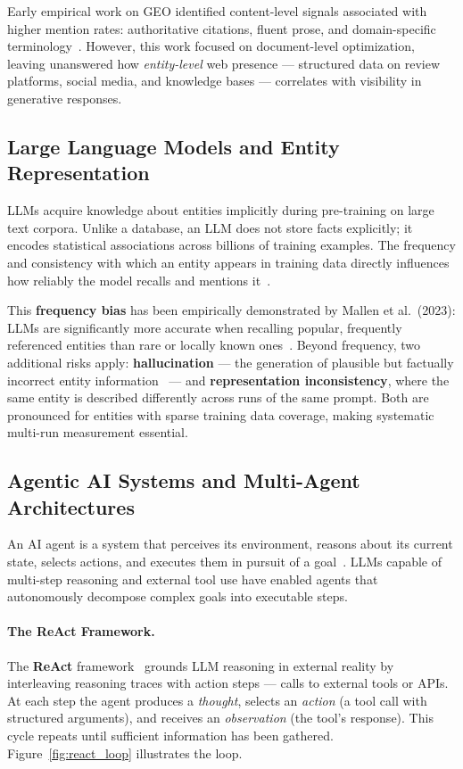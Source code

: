Early empirical work on GEO identified content-level signals associated with higher
mention rates: authoritative citations, fluent prose, and domain-specific
terminology~\cite{aggarwal2023geo}. However, this work focused on document-level
optimization, leaving unanswered how \textit{entity-level} web presence — structured
data on review platforms, social media, and knowledge bases — correlates with
visibility in generative responses.

\subsection{Large Language Models and Entity Representation}

LLMs acquire knowledge about entities implicitly during pre-training on large text
corpora. Unlike a database, an LLM does not store facts explicitly; it encodes
statistical associations across billions of training examples. The frequency and
consistency with which an entity appears in training data directly influences how
reliably the model recalls and mentions it~\cite{mallen2023trust}.

This \textbf{frequency bias} has been empirically demonstrated by Mallen et al.\
(2023): LLMs are significantly more accurate when recalling popular, frequently
referenced entities than rare or locally known ones~\cite{mallen2023trust}. Beyond
frequency, two additional risks apply: \textbf{hallucination} — the generation of
plausible but factually incorrect entity information~\cite{ji2023hallucination} —
and \textbf{representation inconsistency}, where the same entity is described
differently across runs of the same prompt. Both are pronounced for entities with
sparse training data coverage, making systematic multi-run measurement essential.

\subsection{Agentic AI Systems and Multi-Agent Architectures}

An AI agent is a system that perceives its environment, reasons about its current
state, selects actions, and executes them in pursuit of a goal~\cite{russell2020ai}.
LLMs capable of multi-step reasoning and external tool use have enabled agents that
autonomously decompose complex goals into executable steps.

\paragraph{The ReAct Framework.}
The \textbf{ReAct} framework~\cite{yao2022react} grounds LLM reasoning in external
reality by interleaving reasoning traces with action steps — calls to external tools
or APIs. At each step the agent produces a \textit{thought}, selects an
\textit{action} (a tool call with structured arguments), and receives an
\textit{observation} (the tool's response). This cycle repeats until sufficient
information has been gathered. Figure~\ref{fig:react_loop} illustrates the loop.

